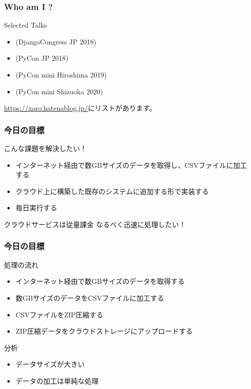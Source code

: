 \documentclass[aspectratio=169,dvipdfmx,14pt,notheorems]{beamer}
\theoremstyle{definition}
\begin{document}
\begin{frame}\frametitle{Who am I ?}

\begin{block}{Selected Talks}
\begin{itemize}
\item {}(DjangoCongress JP 2018)
\item {}(PyCon JP 2018)
\item {}(PyCon mini Hiroshima 2019)
\item {}(PyCon mini Shizuoka 2020)
\end{itemize}
\end{block}
\url{https://xaro.hatenablog.jp/}にリストがあります。
\end{frame}

\begin{frame}\frametitle{今日の目標}

\begin{block}{こんな課題を解決したい！}
\begin{itemize}
\item インターネット経由で数GBサイズのデータを取得し、CSVファイルに加工する
\item クラウド上に構築した既存のシステムに追加する形で実装する
\item 毎日実行する
\end{itemize}
\end{block}

\begin{alertblock}{クラウドサービスは従量課金}
なるべく迅速に処理したい！
\end{alertblock}
\end{frame}

\begin{frame}\frametitle{今日の目標}

\begin{block}{処理の流れ}
\begin{itemize}
\item インターネット経由で数GBサイズのデータを取得する
\item 数GBサイズのデータをCSVファイルに加工する
\item CSVファイルをZIP圧縮する
\item ZIP圧縮データをクラウドストレージにアップロードする
\end{itemize}
\end{block}

\begin{exampleblock}{分析}
\begin{itemize}
\item データサイズが大きい
\item データの加工は単純な処理
\end{itemize}
\end{exampleblock}
\end{frame}
\end{document}
